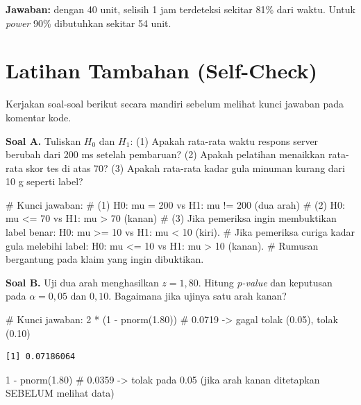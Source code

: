 \documentclass[
  indonesian,
  letterpaper,
]{book}
\newenvironment{Shaded}{\begin{snugshade}}{\end{snugshade}}
\newcommand{\CommentTok}[1]{\textcolor[rgb]{0.37,0.37,0.37}{#1}}
\newcommand{\DecValTok}[1]{\textcolor[rgb]{0.68,0.00,0.00}{#1}}
\newcommand{\FloatTok}[1]{\textcolor[rgb]{0.68,0.00,0.00}{#1}}
\newcommand{\FunctionTok}[1]{\textcolor[rgb]{0.28,0.35,0.67}{#1}}
\newcommand{\NormalTok}[1]{\textcolor[rgb]{0.00,0.23,0.31}{#1}}
\newcommand{\SpecialCharTok}[1]{\textcolor[rgb]{0.37,0.37,0.37}{#1}}
\begin{document}
\textbf{Jawaban:} dengan 40 unit, selisih 1 jam terdeteksi sekitar 81\%
dari waktu. Untuk \emph{power} 90\% dibutuhkan sekitar 54 unit.

\section{Latihan Tambahan
(Self-Check)}\label{latihan-tambahan-self-check-1}

Kerjakan soal-soal berikut secara mandiri sebelum melihat kunci jawaban
pada komentar kode.

\textbf{Soal A.} Tuliskan \(H_0\) dan \(H_1\): (1) Apakah rata-rata
waktu respons server berubah dari 200 ms setelah pembaruan? (2) Apakah
pelatihan menaikkan rata-rata skor tes di atas 70? (3) Apakah rata-rata
kadar gula minuman kurang dari 10 g seperti label?

\begin{Shaded}
\begin{Highlighting}[]
\CommentTok{\# Kunci jawaban:}
\CommentTok{\# (1) H0: mu = 200   vs H1: mu != 200  (dua arah)}
\CommentTok{\# (2) H0: mu \textless{}= 70   vs H1: mu \textgreater{} 70    (kanan)}
\CommentTok{\# (3) Jika pemeriksa ingin membuktikan label benar: H0: mu \textgreater{}= 10 vs H1: mu \textless{} 10 (kiri).}
\CommentTok{\#     Jika pemeriksa curiga kadar gula melebihi label: H0: mu \textless{}= 10 vs H1: mu \textgreater{} 10 (kanan).}
\CommentTok{\#     Rumusan bergantung pada klaim yang ingin dibuktikan.}
\end{Highlighting}
\end{Shaded}

\textbf{Soal B.} Uji dua arah menghasilkan \(z = 1{,}80\). Hitung
\emph{p-value} dan keputusan pada \(\alpha = 0{,}05\) dan \(0{,}10\).
Bagaimana jika ujinya satu arah kanan?

\begin{Shaded}
\begin{Highlighting}[]
\CommentTok{\# Kunci jawaban:}
\DecValTok{2} \SpecialCharTok{*}\NormalTok{ (}\DecValTok{1} \SpecialCharTok{{-}} \FunctionTok{pnorm}\NormalTok{(}\FloatTok{1.80}\NormalTok{))   }\CommentTok{\# 0.0719 {-}\textgreater{} gagal tolak (0.05), tolak (0.10)}
\end{Highlighting}
\end{Shaded}

\begin{verbatim}
[1] 0.07186064
\end{verbatim}

\begin{Shaded}
\begin{Highlighting}[]
\DecValTok{1} \SpecialCharTok{{-}} \FunctionTok{pnorm}\NormalTok{(}\FloatTok{1.80}\NormalTok{)         }\CommentTok{\# 0.0359 {-}\textgreater{} tolak pada 0.05 (jika arah kanan ditetapkan SEBELUM melihat data)}
\end{Highlighting}
\end{Shaded}
\end{document}
